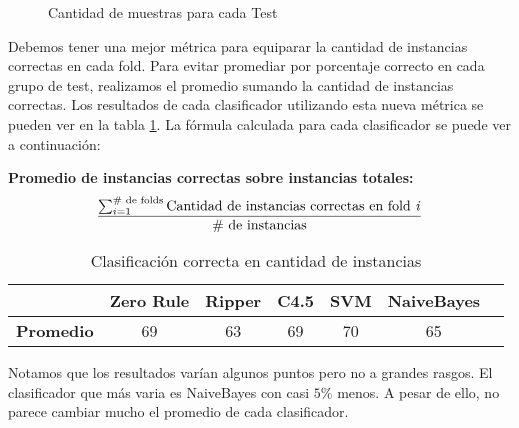 \begin{figure}[H]
	\centering
	\caption{Cantidad de muestras para cada Test}
	\label{CantDeMuestrasXcadaTest}
\end{figure}

Debemos tener una mejor métrica para equiparar la cantidad de instancias correctas en cada fold. Para evitar promediar por porcentaje correcto en cada grupo de test, realizamos el promedio sumando la cantidad de instancias correctas. Los resultados de cada clasificador utilizando esta nueva métrica se pueden ver en la tabla \ref{HPTDT_clas_xval_porHab_total}. La fórmula calculada para cada clasificador se puede ver a continuación:

\textbf{Promedio de instancias correctas sobre instancias totales:}
\small
\[
{ \sum_{i=1}^{\text{\# de folds}} \text{Cantidad de instancias correctas en fold \textit{i}}
	\over
	\text{\# de instancias}
}
\]

{\small 	
\begin{table}[H]
	\centering
	\begin{tabular}{|l|c|c|c|c|c|c|}
		\hline
		\textbf{}  & \textbf{Zero Rule} & \textbf{Ripper} & \textbf{C4.5} & \textbf{SVM} & \textbf{NaiveBayes} \\ \hline
		\textbf{Promedio} & 69  & 63 & 69 & 70 & 65 \\ \hline
	\end{tabular}
	\caption{Clasificación correcta en cantidad de instancias}
	\label{HPTDT_clas_xval_porHab_total}
\end{table}}

Notamos que los resultados varían algunos puntos pero no a grandes rasgos. El clasificador que más varia es NaiveBayes con casi $5\%$ menos. A pesar de ello, no parece cambiar mucho el promedio de cada clasificador.
	



